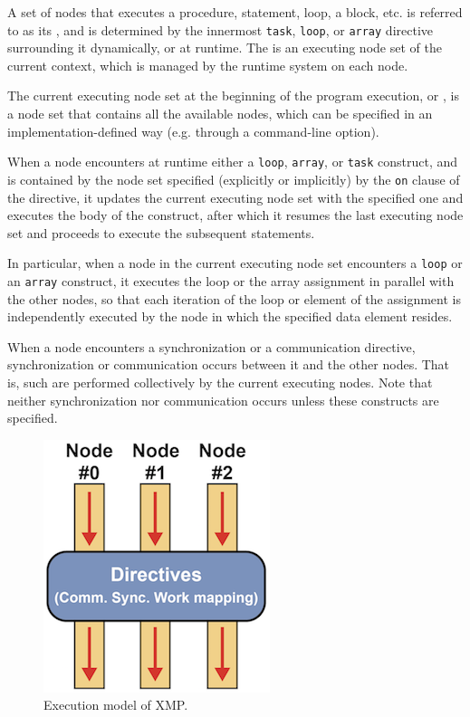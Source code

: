A set of nodes that executes a procedure, statement, loop,
a block, etc. is referred to as its {\it {}}, and
is determined by the innermost {\tt task}, {\tt loop}, or {\tt array}
directive surrounding it dynamically, or at runtime.
%
The {\it {}} is an executing node set of
the current context, which is managed by the {\XMP} runtime system on
each node.

The current executing node set at the beginning of the program
execution, or {\it {}}, is a node set that
contains all the available nodes, which can be specified in an 
implementation-defined way (e.g. through a command-line option).

When a node encounters at runtime either a {\tt loop}, {\tt array}, or
{\tt task} construct, and is contained by the node set specified
(explicitly or implicitly) by the {\tt on} clause of the directive, it
updates the current executing node set with the specified one and
executes the body of the construct, after which it resumes the last
executing node set and proceeds to execute the subsequent statements.

In particular, when a node in the current executing node set encounters a
{\tt loop} or an {\tt array} construct, it executes the loop or the array
assignment in parallel with the other nodes, so that each iteration of the
loop or element of the assignment is independently executed by the node
in which the specified data element resides.

When a node encounters a synchronization or a communication directive,
synchronization or communication occurs between it and the other nodes.
%
That is, such {\it {}} are performed collectively
by the current executing nodes.
%
Note that neither synchronization nor communication occurs unless these
constructs are specified.

\begin{figure}
  \centering
  \includegraphics{figs/execution.png}
  \caption{Execution model of XMP.}\label{fig:exec_model}
\end{figure}


